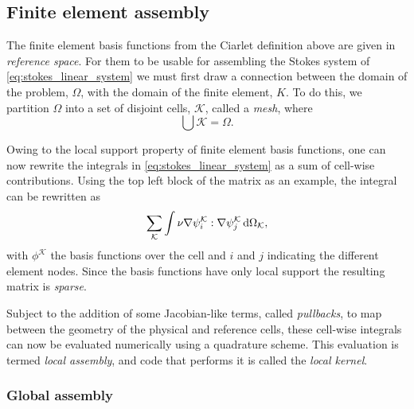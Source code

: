 \documentclass[thesis]{subfiles}
\begin{document}

%
%

\subsection{Finite element assembly}

The finite element basis functions from the Ciarlet definition above are given in \emph{reference space}.
For them to be usable for assembling the Stokes system of \cref{eq:stokes_linear_system} we must first draw a connection between the domain of the problem, $\Omega$, with the domain of the finite element, $K$.
To do this, we partition $\Omega$ into a set of disjoint cells, $\mathcal{K}$, called a \emph{mesh}, where
\begin{equation*}
  \bigcup \mathcal{K} = \Omega.
\end{equation*}

Owing to the local support property of finite element basis functions, one can now rewrite the integrals in \cref{eq:stokes_linear_system} as a sum of cell-wise contributions.
Using the top left block of the matrix as an example, the integral can be rewritten as
\begin{equation}
  \sum_{\mathcal{K}} \int \nu \nabla \psi_i^{\mathcal{K}} : \nabla \psi_j^{\mathcal{K}} \, \textnormal{d}\Omega_{\mathcal{K}},
\end{equation}
with $\phi^{\mathcal{K}}$ the basis functions over the cell and $i$ and $j$ indicating the different element nodes.
Since the basis functions have only local support the resulting matrix is \emph{sparse}.

Subject to the addition of some Jacobian-like terms, called \emph{pullbacks}, to map between the geometry of the physical and reference cells, these cell-wise integrals can now be evaluated numerically using a quadrature scheme.
This evaluation is termed \emph{local assembly}, and code that performs it is called the \emph{local kernel}.

\subsubsection{Global assembly}
\end{document}

